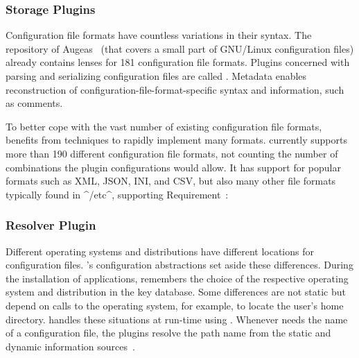 


\subsubsection{Storage Plugins}

Configuration file formats have countless variations in their syntax.
The repository of Augeas~\cite{lutterkort2008augeas} (that covers a small part of GNU/Linux configuration files) already contains lenses for 181 configuration file formats.
Plugins concerned with parsing and serializing configuration files are called .
Metadata enables reconstruction of configuration-file-format-specific syntax and information, such as comments.

To better cope with the vast number of existing configuration file formats, \elektra{} benefits from techniques to rapidly implement many formats.
\elektra{} currently supports more than 190 different configuration file formats, not counting the number of combinations the plugin configurations would allow.
It has support for popular formats such as XML, JSON, INI, and CSV, but also many other file formats typically found in ^/etc^, supporting Requirement~:
\reqLegacy*




\subsubsection{Resolver Plugin}
\label{resolver}

Different operating systems and distributions have different locations for configuration files.
\elektra{}'s configuration abstractions set aside these differences.
During the installation of applications, \elektra{} remembers the choice of the respective operating system and distribution in the key database.
Some differences are not static but depend on calls to the operating system, for example, to locate the user's home directory.
\elektra{} handles these situations at run-time using .
Whenever \elektra{} needs the name of a configuration file, the plugins resolve the path name from the static and dynamic information sources~\cite{raab2015kps}.

